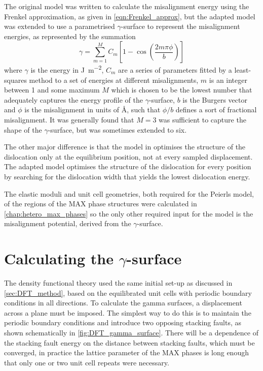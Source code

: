 The original model was written to calculate the misalignment energy using the Frenkel approximation, as given in \autoref{eqn:Frenkel_approx}, but the adapted model was extended to use a parametrised $\gamma$-surface to represent the misalignment energies, as represented by the summation
\begin{equation}
\gamma = \sum_{m=1}^{M} C_m \left[ 1 - \cos \left( \frac{2m\pi \phi}{b} \right) \right]\label{eqn:gamma_surface}
\end{equation}
where $\gamma$ is the energy in \si{\joule\per\meter\squared}, $C_m$ are a series of parameters fitted by a least-squares method to a set of energies at different misalignments, $m$ is an integer between 1 and some maximum $M$ which is chosen to be the lowest number that adequately captures the energy profile of the $\gamma$-surface, $b$ is the Burgers vector and $\phi$ is the misalignment in units of \si{\angstrom}, such that $\phi/b$ defines a sort of fractional misalignment. It was generally found that $M=3$ was sufficient to capture the shape of the $\gamma$-surface, but was sometimes extended to six.

The other major difference is that the model in \cite{Clegg2006} optimises the structure of the dislocation only at the equilibrium position, not at every sampled displacement. The adapted model optimises the structure of the dislocation for every position by searching for the dislocation width that yields the lowest dislocation energy.


The elastic moduli and unit cell geometries, both required for the Peierls model, of the regions of the MAX phase structures were calculated in \autoref{chap:hetero_max_phases} so the only other required input for the model is the misalignment potential, derived from the $\gamma$-surface.

\section{Calculating the \texorpdfstring{$\gamma$}{gamma}-surface}


The density functional theory used the same initial set-up as discussed in \autoref{sec:DFT_method}, based on the equilibrated unit cells with periodic boundary conditions in all directions. To calculate the gamma surfaces, a displacement across a plane must be imposed. The simplest way to do this is to maintain the periodic boundary conditions and introduce two opposing stacking faults, as shown schematically in \autoref{fig:DFT_gamma_surface}. There will be a dependence of the stacking fault energy on the distance between stacking faults, which must be converged, in practice the lattice parameter of the MAX phases is long enough that only one or two unit cell repeats were necessary.

